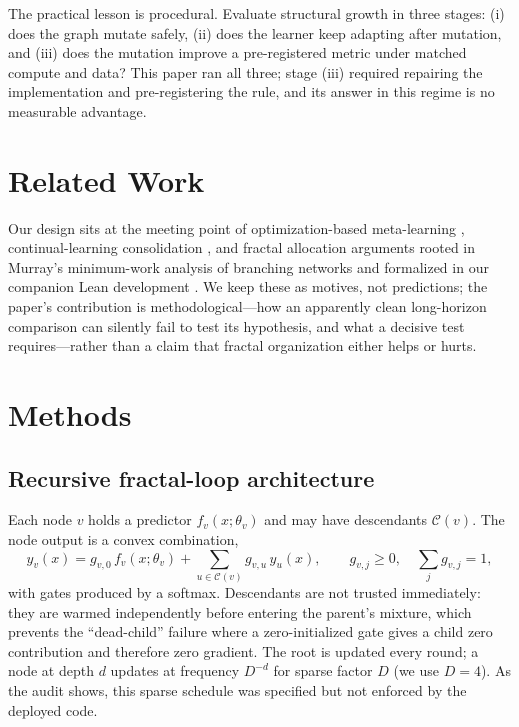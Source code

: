 \documentclass[11pt]{article}
\begin{document}
The practical lesson is procedural. Evaluate structural growth in three stages: (i) does the graph mutate safely, (ii) does the learner keep adapting after mutation, and (iii) does the mutation improve a pre-registered metric under matched compute and data? This paper ran all three; stage (iii) required repairing the implementation and pre-registering the rule, and its answer in this regime is no measurable advantage.

\section{Related Work}\label{sec:related}

Our design sits at the meeting point of optimization-based meta-learning \cite{Finn2017,Li2017}, continual-learning consolidation \cite{Kirkpatrick2017}, and fractal allocation arguments rooted in Murray's minimum-work analysis of branching networks \cite{Murray1926} and formalized in our companion Lean development \cite{LmPrincipleFractal}. We keep these as motives, not predictions; the paper's contribution is methodological---how an apparently clean long-horizon comparison can silently fail to test its hypothesis, and what a decisive test requires---rather than a claim that fractal organization either helps or hurts.

\section{Methods}

\subsection{Recursive fractal-loop architecture}

Each node $v$ holds a predictor $f_v(x;\theta_v)$ and may have descendants $\mathcal{C}(v)$. The node output is a convex combination,
\begin{equation}
 y_v(x) = g_{v,0}\,f_v(x;\theta_v) + \sum_{u\in\mathcal{C}(v)} g_{v,u}\,y_u(x),
 \qquad g_{v,j}\ge 0,\quad \sum_j g_{v,j}=1,
\end{equation}
with gates produced by a softmax. Descendants are not trusted immediately: they are warmed independently before entering the parent's mixture, which prevents the ``dead-child'' failure where a zero-initialized gate gives a child zero contribution and therefore zero gradient. The root is updated every round; a node at depth $d$ updates at frequency $D^{-d}$ for sparse factor $D$ (we use $D=4$). As the audit shows, this sparse schedule was specified but not enforced by the deployed code.
\end{document}

